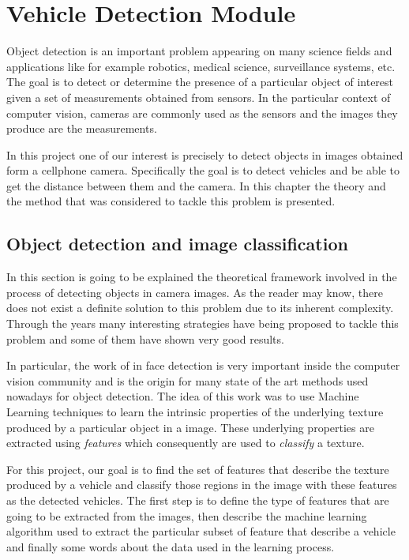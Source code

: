 \chapter{Vehicle Detection Module}  \label{kap:vehicle-detection}

Object detection is an important problem appearing on many science fields and
applications like for example robotics, medical science, surveillance systems, etc. The
goal is to detect or determine the presence of a particular object of interest
given a set of measurements obtained from sensors. In the particular context of
computer vision, cameras are commonly used as the sensors and the images they
produce are the measurements.

In this project one of our interest is precisely to detect objects in images 
obtained form a cellphone camera. Specifically the goal is to detect vehicles and 
be able to get the distance between them and the camera. In this
chapter the theory and the method that was considered to
tackle this problem is presented.

\section{Object detection and image classification} %
\label{sec:objectdetec}

In this section is going to be explained the theoretical framework involved
in the process of detecting objects in camera images. As the reader may know,
there does not exist a definite solution to this problem due to its inherent
complexity. Through the years many interesting strategies have being proposed to
tackle this problem and some of them have shown very good results.

In particular, the work of \cite{viola-jones} in face detection is very
important inside the computer vision community and is the origin for many state
of the art methods used nowadays for object detection. The idea of this work was
to use Machine Learning techniques to learn the intrinsic properties of the
underlying texture produced by a particular object in a image. These underlying
properties are extracted using \textit{features} which consequently are
used to \textit{classify} a texture.

For this project, our goal is to find the set of features that describe the
texture produced by a vehicle and classify those regions in the image with these
features as the detected vehicles. The first step is to define the type of features
that are going to be extracted from the images, then describe the
machine learning algorithm used to extract the particular subset of feature that
describe a vehicle and finally some words about the data used in the learning
process.

